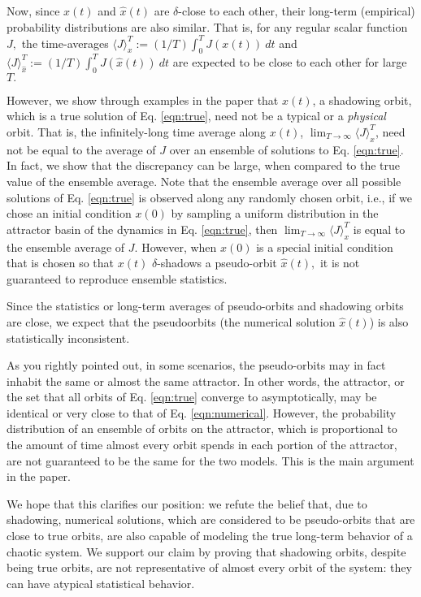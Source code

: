 \documentclass[11pt]{article}
\begin{document}
Now, since $x(t)$ and $\hat{x}(t)$ are $\delta$-close to each other, their long-term (empirical) probability distributions are also similar. That is, for any regular scalar function $J,$ the time-averages $\langle J\rangle_x^T := (1/T)\int_0^T J(x(t))\: dt$ and 
$\langle J\rangle_{\hat{x}}^T := (1/T) \int_0^T J(\hat{x}(t)) \: dt$ are expected to be close to each other for large $T.$ 

However, we show through examples in the paper that $x(t)$, a shadowing orbit, which is a true solution of Eq. \ref{eqn:true}, need not be a typical or a {\em physical} orbit. That is, the infinitely-long time average along $x(t)$, $\lim_{T\to\infty} \langle J\rangle_x^T$, need not be equal to the average of $J$ over an ensemble of solutions to Eq. \ref{eqn:true}. In fact, we show that the discrepancy can be large, when compared to the true value of the ensemble average. Note that the ensemble average over all possible solutions of Eq. \ref{eqn:true} is observed along any randomly chosen orbit, i.e., if we chose an initial condition $x(0)$ by sampling a uniform distribution in the attractor basin of the dynamics in Eq. \ref{eqn:true}, then $\lim_{T\to\infty}\langle J\rangle_x^T$ is equal to the ensemble average of $J.$ However, when $x(0)$ is a special initial condition that is chosen so that $x(t)$ $\delta$-shadows a pseudo-orbit $\hat{x}(t),$ it is not guaranteed to reproduce ensemble statistics.

Since the statistics or long-term averages of pseudo-orbits and shadowing orbits are close, we expect that the pseudoorbits (the numerical solution $\hat{x}(t)$) is also statistically inconsistent. 

As you rightly pointed out, in some scenarios, the pseudo-orbits may in fact inhabit the same or almost the same attractor. In other words, the attractor, or the set that all orbits of Eq. \ref{eqn:true} converge to asymptotically, may be identical or very close to that of Eq. \ref{eqn:numerical}. However, the probability distribution of an ensemble of orbits on the attractor, which is proportional to the amount of time almost every orbit spends in each portion of the attractor, are not guaranteed to be the same for the two models. This is the main argument in the paper.

We hope that this clarifies our position: we refute the belief that, due to shadowing, numerical solutions, which are considered to be pseudo-orbits that are close to true orbits, are also capable of modeling the true long-term behavior of a chaotic system. We support our claim by proving that shadowing orbits, despite being true orbits, are not representative of almost every orbit of the system: they can have atypical statistical behavior. 
\end{document}
